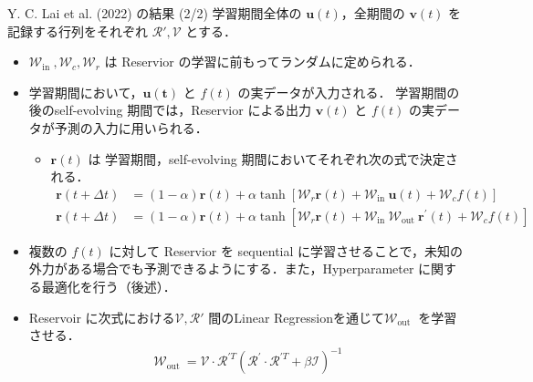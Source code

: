 \begin{frame}{Y. C. Lai et al. (2022) の結果 (2/2)}
    学習期間全体の $\mathbf{u}(t)$，全期間の $\mathbf{v}(t)$ を記録する行列をそれぞれ $\mathcal{R'}, \mathcal{V}$ とする．
    \begin{itemize}
        \item $\mathcal{W}_{\text {in }}, \mathcal{W}_c, \mathcal{W}_r$ は Reservior の学習に前もってランダムに定められる．
        \item 学習期間において，$\mathbf{u(t)}$ と $f(t)$ の実データが入力される．
        学習期間の後のself-evolving 期間では，Reservior による出力 $\mathbf{v}(t)$ と $f(t)$ の実データが予測の入力に用いられる．
        \begin{itemize}
            \item $\mathbf{r}(t)$ は 学習期間，self-evolving 期間においてそれぞれ次の式で決定される．
            \vspace{-.2cm}
            \begin{align}
                \mathbf{r}(t+\Delta t) & =(1-\alpha) \mathbf{r}(t) + \alpha \tanh \left[\mathcal{W}_r \mathbf{r}(t)+\mathcal{W}_{\text {in }} \mathbf{u}(t)+\mathcal{W}_c f(t)\right] \label{Lai_r1}\\
                \mathbf{r}(t+\Delta t) & =(1-\alpha) \mathbf{r}(t) + \alpha \tanh \left[\mathcal{W}_r \mathbf{r}(t)+\mathcal{W}_{\text {in }} \mathcal{W}_{\text {out }} \mathbf{r}^{\prime}(t)+\mathcal{W}_c f(t)\right]\label{Lai_r2}
            \end{align}
        \end{itemize}
        \item 複数の $f(t)$ に対して Reservior を sequential に学習させることで，未知の外力がある場合でも予測できるようにする．また，Hyperparameter に関する最適化を行う（後述）．
        \item Reservoir に次式における$\mathcal{V}, \mathcal{R'}$ 間のLinear Regressionを通じて$\mathcal{W}_{\text {out }}$ を学習させる．
        \vspace{-.2cm}
        \begin{align}
            \mathcal{W}_{\text {out }}=\mathcal{V} \cdot \mathcal{R}^{\prime T}\left(\mathcal{R}^{\prime} \cdot \mathcal{R}^{\prime T}+\beta \mathcal{I}\right)^{-1}
        \end{align}
    \end{itemize}

\end{frame}

